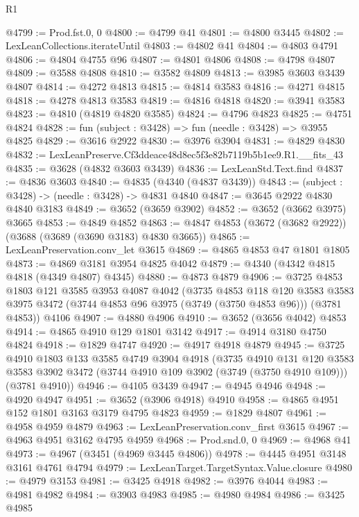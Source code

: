 \begin{lexlean}{R1}
\begin{coremodule}
@4799 := Prod.fst.{0, 0}
@4800 := @4799 @41
@4801 := @4800 @3445
@4802 := LexLeanCollections.iterateUntil
@4803 := @4802 @41
@4804 := @4803 @4791
@4806 := @4804 @4755 @96
@4807 := @4801 @4806
@4808 := @4798 @4807
@4809 := @3588 @4808
@4810 := @3582 @4809
@4813 := @3985 @3603 @3439 @4807
@4814 := @4272 @4813
@4815 := @4814 @3583
@4816 := @4271 @4815
@4818 := @4278 @4813 @3583
@4819 := @4816 @4818
@4820 := @3941 @3583
@4823 := @4810 (@4819 @4820 @3585)
@4824 := @4796 @4823
@4825 := @4751 @4824
@4828 := fun (subject : @3428) => fun (needle : @3428) => @3955 @4825
@4829 := @3616 @2922
@4830 := @3976 @3904
@4831 := @4829 @4830
@4832 := LexLeanPreserve.Cf3ddeace48d8ec5f3e82b7119b5b1ee9.R1.__fits_43
@4835 := @3628 (@4832 @3603 @3439)
@4836 := LexLeanStd.Text.find
@4837 := @4836 @3603
@4840 := @4835 (@4340 (@4837 @3439))
@4843 := (subject : @3428) -> (needle : @3428) -> @4831 @4840
@4847 := @3645 @2922 @4830 @4840 @3183
@4849 := @3652 (@3659 @3902)
@4852 := @3652 (@3662 @3975) @3665
@4853 := @4849 @4852
@4863 := @4847 @4853 (@3672 (@3682 @2922)) (@3688 (@3689 (@3690 @3183) @4830 @3665))
@4865 := LexLeanPreservation.conv_let @3615
@4869 := @4865 @4853 @47 @1801 @1805
@4873 := @4869 @3181 @3954 @4825 @4042
@4879 := @4340 (@4342 @4815 @4818 (@4349 @4807) @4345)
@4880 := @4873 @4879
@4906 := @3725
    @4853
    @1803
    @121
    @3585
    @3953
    @4087
    @4042
    (@3735
      @4853
      @118
      @120
      @3583
      @3583
      @3975
      @3472
      (@3744 @4853 @96 @3975 (@3749 (@3750 @4853 @96)))
      (@3781 @4853))
    @4106
@4907 := @4880 @4906
@4910 := @3652 (@3656 @4042) @4853
@4914 := @4865 @4910 @129 @1801 @3142
@4917 := @4914 @3180 @4750 @4824
@4918 := @1829 @4747
@4920 := @4917 @4918 @4879
@4945 := @3725
    @4910
    @1803
    @133
    @3585
    @4749
    @3904
    @4918
    (@3735
      @4910
      @131
      @120
      @3583
      @3583
      @3902
      @3472
      (@3744 @4910 @109 @3902 (@3749 (@3750 @4910 @109)))
      (@3781 @4910))
@4946 := @4105 @3439
@4947 := @4945 @4946
@4948 := @4920 @4947
@4951 := @3652 (@3906 @4918) @4910
@4958 := @4865 @4951 @152 @1801 @3163 @3179 @4795 @4823
@4959 := @1829 @4807
@4961 := @4958 @4959 @4879
@4963 := LexLeanPreservation.conv_first @3615
@4967 := @4963 @4951 @3162 @4795 @4959
@4968 := Prod.snd.{0, 0}
@4969 := @4968 @41
@4973 := @4967 (@3451 (@4969 @3445 @4806))
@4978 := @4445 @4951 @3148 @3161 @4761 @4794
@4979 := LexLeanTarget.TargetSyntax.Value.closure
@4980 := @4979 @3153
@4981 := @3425 @4918
@4982 := @3976 @4044
@4983 := @4981 @4982
@4984 := @3903 @4983
@4985 := @4980 @4984
@4986 := @3425 @4985

\end{coremodule}
\end{lexlean}
